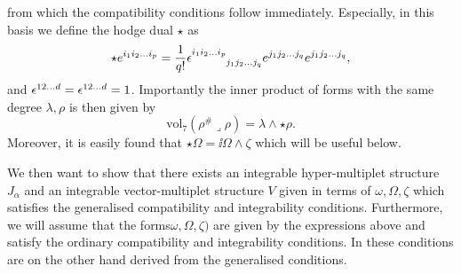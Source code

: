 from which the compatibility conditions follow immediately. Especially, in this basis we define the hodge dual $\star$ as 
\begin{equation}
    \star e^{i_1i_2\ldots i_p} = \frac{1}{q!}\tensor{\epsilon}{^{i_1i_2\ldots i_p}_{j_1j_2\ldots j_q}}e^{j_1j_2\ldots j_q}e^{j_1j_2\ldots j_q},
\end{equation}
and $\tensor{\epsilon}{^{12\ldots d}}=\tensor{\epsilon}{^{12\ldots d}}=1$. Importantly the inner product of forms with the same degree $\lambda,\rho$ is then given by
\begin{equation}
    \text{vol}_7(\rho^{\#}\lrcorner \rho) = \lambda\wedge\star\rho.
\end{equation}
Moreover, it is easily found that $\star\Omega = \ii\Omega\wedge\zeta$ which will be useful below. 

We then want to show that there exists an integrable hyper-multiplet structure $J_\alpha$ and an integrable vector-multiplet structure $V$ given in terms of ${\omega,\Omega,\zeta}$ which satisfies the generalised compatibility and integrability conditions. Furthermore, we will assume that the forms$\omega,\Omega,\zeta)$ are given by the expressions above and satisfy the ordinary compatibility and integrability conditions. In \cite{Ashmore:2015joa} these conditions are on the other hand derived from the generalised conditions. 

